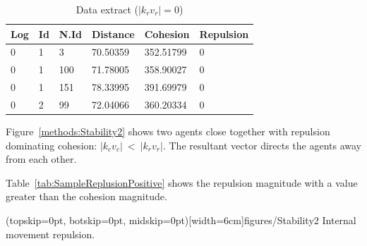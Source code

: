 \documentclass{ieeeaccess}
\begin{document}

\begin{table}[H]
\begin{center}
\begin{tabular}{| l | l | l | l | l | l |}
\hline
Log &	Id &	N.Id &	Distance &	{\color{green}Cohesion} &	{\color{red}Repulsion} 	\\ \hline
0 &	1 &	3 	 & 70.50359 &	{\color{green}352.51799} &	{\color{red}0} \\ \hline
0 &	1 &	100 & 71.78005 &	{\color{green}358.90027} &	{\color{red}0} \\ \hline
0 &	1 &	151 & 78.33995 &	{\color{green}391.69979} &	{\color{red}0} \\ \hline
0 &	2 &	99  &	72.04066 &	{\color{green}360.20334} &	{\color{red}0} \\ 
\hline
\end{tabular}\caption{Data extract ($|k_rv_r| = 0$)} \label{tab:SampleReplusion0}
\end{center}
\end{table}

Figure~\ref{methods:Stability2} shows two agents close together with repulsion
dominating cohesion: $|k_cv_c|~<~|k_rv_r|$. The resultant vector directs the
agents away from each other. 

Table~\ref{tab:SampleReplusionPositive} shows the repulsion magnitude with a
value greater than the cohesion magnitude.

\Figure[t!](topskip=0pt, botskip=0pt,
midskip=0pt)[width=6cm]{figures/Stability2} {Internal movement
repulsion.\label{methods:Stability2}}

\end{document}

